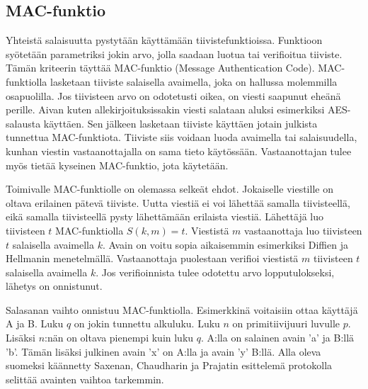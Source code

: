 \documentclass[finnish]{tktltiki2}
\theoremstyle{definition}
\theoremstyle{remark}
\begin{document}
\subsection{MAC-funktio}

Yhteistä salaisuutta pystytään käyttämään tiivistefunktioissa. Funktioon syötetään parametriksi jokin arvo, jolla saadaan luotua tai  verifioitua tiiviste. Tämän kriteerin täyttää MAC-funktio (Message Authentication Code). MAC-funktiolla lasketaan tiiviste salaisella avaimella, joka on hallussa molemmilla osapuolilla. Jos tiivisteen arvo on odotetusti oikea, on viesti saapunut eheänä perille. Aivan kuten allekirjoituksissakin viesti salataan aluksi esimerkiksi AES-salausta käyttäen. Sen jälkeen lasketaan tiiviste käyttäen jotain julkista tunnettua MAC-funktiota. Tiiviste siis voidaan luoda avaimella tai salaisuudella, kunhan viestin vastaanottajalla on sama tieto käytössään. Vastaanottajan tulee myös tietää kyseinen MAC-funktio, jota käytetään.

Toimivalle MAC-funktiolle on olemassa selkeät ehdot. Jokaiselle viestille on oltava erilainen pätevä tiiviste. Uutta viestiä ei voi lähettää samalla tiivisteellä, eikä samalla tiivisteellä pysty lähettämään erilaista viestiä. Lähettäjä luo tiivisteen $t$ MAC-funktiolla $S(k,m) = t$. Viestistä $m$ vastaanottaja luo tiivisteen $t$  salaisella avaimella $k$. Avain on voitu sopia aikaisemmin esimerkiksi Diffien ja Hellmanin menetelmällä. Vastaanottaja puolestaan verifioi viestistä $m$ tiivisteen $t$ salaisella avaimella $k$. Jos verifioinnista tulee odotettu arvo lopputulokseksi, lähetys on onnistunut. \cite{MACA} 
 
Salasanan vaihto onnistuu MAC-funktiolla. Esimerkkinä voitaisiin ottaa käyttäjä A ja B. Luku $q$ on jokin tunnettu alkuluku. Luku $n$ on primitiivijuuri luvulle $p$. Lisäksi $n$:nän on oltava pienempi kuin luku $q$. A:lla on salainen avain 'a' ja B:llä 'b'. Tämän lisäksi julkinen avain 'x' on A:lla ja avain 'y' B:llä. Alla oleva suomeksi käännetty Saxenan, Chaudharin ja Prajatin \cite{MAC} esittelemä protokolla selittää avainten vaihtoa tarkemmin.
\end{document}
